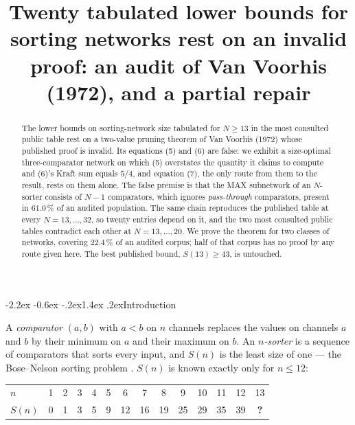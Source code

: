 \documentclass[11pt,a4paper]{article}
\title{Twenty tabulated lower bounds for sorting networks rest on
an invalid proof: an audit of Van Voorhis (1972), and a partial repair}
\author{}
\date{}
\makeatletter
\renewcommand\section{\@startsection{section}{1}{\z@}%
  {-2.2ex \@plus -0.6ex \@minus -.2ex}{1.4ex \@plus.2ex}{\normalfont\large\bfseries}}
\makeatother
\begin{document}
\maketitle
\vspace{-3.5em}

\begin{abstract}
\noindent
The lower bounds on sorting-network size tabulated for $N \ge 13$ in the most
consulted public table rest on a two-value pruning theorem of Van Voorhis (1972)
whose published proof is invalid. Its
equations (5) and (6) are false: we exhibit a size-optimal three-comparator
network on which (5) overstates the quantity it claims to compute and (6)'s
Kraft sum equals $5/4$, and equation (7), the only route from them to the
result, rests on them alone. The false premise is that the MAX subnetwork of an
$N$-sorter consists of $N-1$ comparators, which ignores \emph{pass-through}
comparators, present in $61.0\,\%$ of an audited population. The same chain
reproduces the published table at every $N = 13,\dots,32$, so twenty entries
depend on it, and the two most consulted public tables contradict each other at
$N = 13,\dots,20$. We prove the theorem for two classes of networks, covering
$22.4\,\%$ of an audited corpus; half of that corpus has no proof by any route
given here. The best published bound, $S(13) \ge 43$, is untouched.
\end{abstract}

\section{Introduction}

A \emph{comparator} $(a,b)$ with $a<b$ on $n$ channels replaces the values on
channels $a$ and $b$ by their minimum on $a$ and their maximum on $b$. An
\emph{$n$-sorter} is a sequence of comparators that sorts every input, and
$S(n)$ is the least size of one --- the Bose--Nelson sorting problem
\cite{BN62}. $S(n)$ is known exactly only for $n \le 12$:

\begin{center}
\begin{tabular}{lccccccccccccc}
\toprule
$n$ & 1 & 2 & 3 & 4 & 5 & 6 & 7 & 8 & 9 & 10 & 11 & 12 & 13 \\
$S(n)$ & 0 & 1 & 3 & 5 & 9 & 12 & 16 & 19 & 25 & 29 & 35 & 39 & \textbf{?} \\
\bottomrule
\end{tabular}
\end{center}
\end{document}
